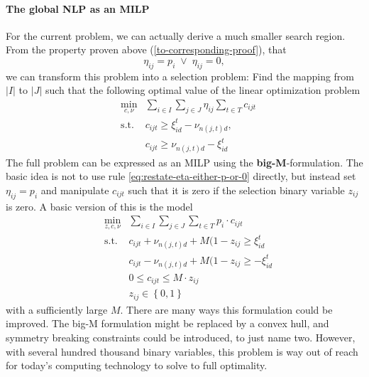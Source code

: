 \documentclass[a4paper, 12pt] {article}
\begin{document}
\paragraph{The global NLP as an MILP} For the current problem, we can actually derive a much smaller search region. From the property proven above (\ref{to-corresponding-proof}), that
\begin{equation}
  \label{eq:restate-eta-either-p-or-0}
  \eta_{ij} = p_i \;\vee \; \eta_{ij}=0,
\end{equation}
we can transform this problem into a selection problem: Find the mapping from $|I|$ to $|J|$ such that the following optimal value of the linear optimization problem
\begin{eqnarray}
  \label{eq:global-NLP-as-MILP-inner-LP}
  &\min\limits_{c,\nu}&\sum_{i\in I}\sum_{j\in J}\eta_{ij}\sum_{t\in T}c_{ijt}\\
  &\mathrm{s.t.}&c_{ijt} \geq \xi_{id}^t - \nu_{n(j,t)d},\\
  &&c_{ijt} \geq \nu_{n(j,t)d} - \xi_{id}^t
\end{eqnarray}
The full problem can be expressed as an MILP using the \textbf{big-M}-formulation. The basic idea is not to use rule \ref{eq:restate-eta-either-p-or-0} directly, but instead set $\eta_{ij}=p_i$ and manipulate $c_{ijt}$ such that it is zero if the selection binary variable $z_{ij}$ is zero. A basic version of this is the model
\begin{eqnarray}
  \label{eq:NLP-as-MILP-full}
  &\min\limits_{z,c,\nu}&\sum_{i\in I}\sum_{j\in J}\sum_{t\in T}p_i\cdot c_{ijt}\\
  &\mathrm{s.t.}&c_{ijt}+ \nu_{n(j,t)d}+M(1-z_{ij} \geq \xi_{id}^t\\
  &&c_{ijt} -\nu_{n(j,t)d} +M(1-z_{ij}\geq - \xi_{id}^t\\
  &&0\leq c_{ijt} \leq M\cdot z_{ij}\\
  \label{eq:NLP-as-MILP-full-bounds}
  &&z_{ij}\in \left\{0,1\right\}
\end{eqnarray}
with a sufficiently large $M$. There are many ways this formulation could be improved. The big-M formulation might be replaced by a convex hull, and symmetry breaking constraints could be introduced, to just name two. However, with several hundred thousand binary variables,  this problem is way out of reach for today's computing technology to solve to full optimality.
\end{document}
